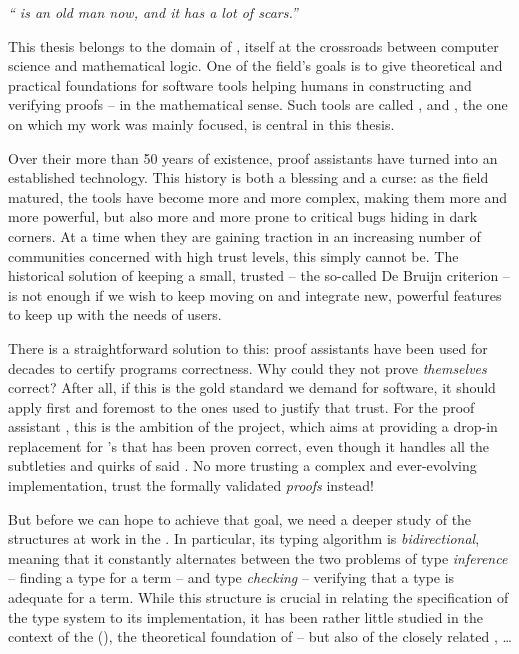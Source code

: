 \emph{“ is an old man now, and it has a lot of scars.”}
\vspace{-1.5em}
\begin{flushright}
\end{flushright}

\margintoc[4em]

This thesis belongs to the domain of ,%
itself at the crossroads between computer science and mathematical logic.
One of the field’s goals is to give theoretical and practical foundations
for software tools helping humans in constructing and verifying proofs –
in the mathematical sense.
Such tools are called , and , the one
on which my work was mainly focused, is central in this thesis.

Over their more than 50 years of existence, proof assistants have
turned into an established technology. This history is both a blessing and a curse: as
the field matured, the tools have become more and more complex, making them more and more
powerful, but also more and more prone to critical bugs hiding in dark corners. At a time
when they are gaining traction in an increasing number of communities
concerned with high trust levels, this simply cannot be.
The historical solution of keeping a small, trusted 
– the so-called De Bruijn criterion –
is not enough if we wish to keep moving on and integrate new, powerful features
to keep up with the needs of users.

There is a straightforward solution to this:
proof assistants have been used for decades to certify programs correctness.
Why could they not prove \emph{themselves} correct? After all, if this is
the gold standard we demand for software, it should apply first and foremost to the ones
used to justify that trust. For the proof assistant ,
this is the ambition of the  project,
which aims at providing a drop-in replacement for ’s  that has been
proven correct,
even though it handles all the subtleties and quirks of said .
No more trusting a complex and ever-evolving implementation, trust the formally validated
\emph{proofs} instead!

But before we can hope to achieve that goal, we need a deeper study of the structures at work
in the . In particular, its typing algorithm is \emph{bidirectional}, meaning that
it constantly alternates between the two problems of type \emph{inference} –
finding a type for a term – and type \emph{checking} –
verifying that a type is adequate for a term. While this
structure is crucial in relating the specification of the type system to its implementation,
it has been rather little studied in the context of the
 (),
the theoretical foundation of  – but also of the closely related
, …

